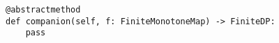 \begin{verbatim}
@abstractmethod
def companion(self, f: FiniteMonotoneMap) -> FiniteDP:
    pass
\end{verbatim}